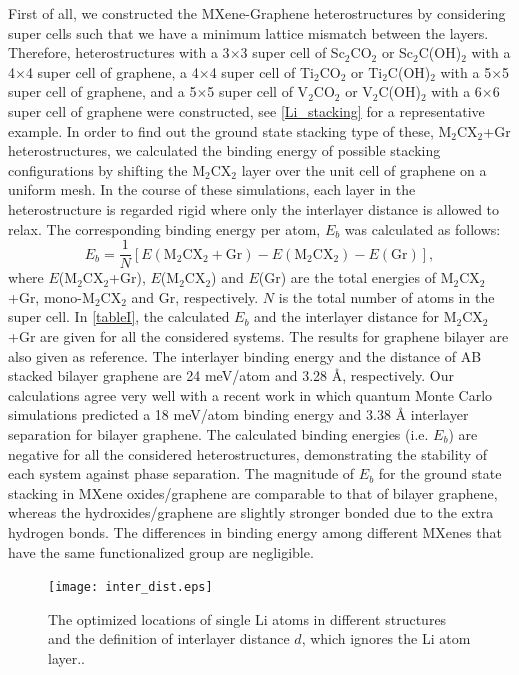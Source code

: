 First of all, we constructed the MXene-Graphene heterostructures by considering super cells such that we have a minimum lattice mismatch between the layers. Therefore, heterostructures with a 3$\times$3 super cell of Sc$_2$CO$_2$ or Sc$_2$C(OH)$_2$ with a 4$\times$4 super cell of graphene, a  4$\times$4 super cell of Ti$_2$CO$_2$ or Ti$_2$C(OH)$_2$ with a 5$\times$5 super cell of graphene, and a 5$\times$5 super cell of V$_2$CO$_2$ or V$_2$C(OH)$_2$ with a 6$\times$6 super cell of graphene were constructed, see \autoref{Li_stacking} for a representative example. In order to find out the ground state stacking type of these, M$_2$CX$_2$+Gr heterostructures, we calculated the binding energy of possible stacking configurations by shifting the M$_2$CX$_2$ layer over the unit cell of graphene on a uniform mesh. In the course of these simulations, each layer in the heterostructure is regarded rigid where only the interlayer distance is allowed to relax. The corresponding binding energy per atom, $E_b$ was calculated as follows:
\begin{equation}
E_b=\frac{1}{N}[E(\mathrm{M}_2\mathrm{C}\mathrm{X}_2+\mathrm{Gr})-E(\mathrm{M}_2\mathrm{C}\mathrm{X}_2)-E(\mathrm{Gr})],
\end{equation}
where $E$(M$_2$CX$_2$+Gr), $E$(M$_2$CX$_2$) and $E$(Gr) are the total energies of M$_2$CX$_2$+Gr, mono-M$_2$CX$_2$ and Gr, respectively. $N$ is the total number of atoms in the super cell. In \autoref{tableI}, the calculated $E_b$ and the interlayer distance for M$_2$CX$_2$+Gr are given  for all the considered systems. The results for graphene bilayer are also given as reference. The interlayer binding energy and the distance of AB stacked bilayer graphene are 24 meV/atom and 3.28 {\AA}, respectively. Our calculations agree very well with a recent work in which quantum Monte Carlo simulations predicted a 18 meV/atom binding energy and 3.38 {\AA} interlayer separation for bilayer graphene\cite{PhysRevLett.115.115501}. The calculated binding energies (i.e. $E_b$) are negative for all the considered heterostructures, demonstrating the stability of each system against phase separation. The magnitude of $E_b$ for the ground state stacking in MXene oxides/graphene are comparable to that of bilayer graphene, whereas the hydroxides/graphene are slightly stronger bonded due to the extra hydrogen bonds. The differences in binding energy among different MXenes that have the same functionalized group are negligible.



\begin{figure}[htb]
\centering
\texttt{[image: inter\_dist.eps]}%
\caption{The optimized locations of single Li atoms in different structures and the definition of interlayer distance $d$, which ignores the Li atom layer.\label{inter-dist}.}
\end{figure}

